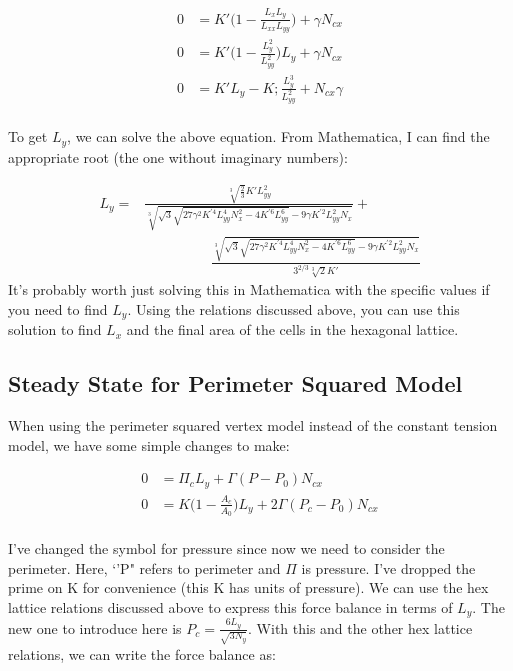 \documentclass[12pt]{article}
\begin{document}
\begin{center}
\begin{equation}
\begin{split}
0 &= K'\bigg( 1 - \frac{L_x L_y}{L_{xx} L_{yy}}\bigg) + \gamma N_{cx}\\
0 &= K'\bigg( 1 - \frac{L_y^2}{L_{yy}^2} \bigg)L_y + \gamma N_{cx}\\
0 &= K' L_y - K;\frac{L_y^3}{L_{yy}^2} + N_{cx} \gamma\\
\end{split}
\end{equation}
\end{center}
To get $L_y$, we can solve the above equation. From Mathematica, I can find the appropriate root (the one without imaginary numbers):

\begin{equation}
\begin{split}
L_y = &\frac{\sqrt[3]{\frac{2}{3}} K' L_{yy}^2}{\sqrt[3]{\sqrt{3} \sqrt{27 \gamma ^2 K^{'4} L_{yy}^4 N_x^2-4 K^{'6} L_{yy}^6}-9 \gamma  K^{'2} L_{yy}^2 N_x}} +\\  &\hspace{2cm} \frac{\sqrt[3]{\sqrt{3} \sqrt{27 \gamma ^2 K^{'4} L_{yy}^4 N_x^2-4 K^{'6} L_{yy}^6}-9 \gamma  K^{'2} L_{yy}^2 N_x}}{3^{2/3} \sqrt[3]{2}  K'}
\end{split}
\end{equation}
It's probably worth just solving this in Mathematica with the specific values if you need to find $L_y$. Using the relations discussed above, you can use this solution to find $L_x$ and the final area of the cells in the hexagonal lattice. 

\subsection{Steady State for Perimeter Squared Model}
When using the perimeter squared vertex model instead of the constant tension model, we have some simple changes to make:
\begin{center}
\begin{equation}
\begin{split}
0 &= \Pi_c L_y + \Gamma (P - P_0) N_{cx} \\
0 &= K \bigg(1 - \frac{A_c}{A_0}\bigg) L_y + 2 \Gamma (P_c - P_0) N_{cx}\\
\end{split}
\end{equation}
\end{center}
I've changed the symbol for pressure since now we need to consider the perimeter. Here, `'P" refers to perimeter and $\Pi$ is pressure.   I've dropped the prime on K for convenience (this K has units of pressure). We can use the hex lattice relations discussed above to express this force balance in terms of $L_y$. The new one to introduce here is $P_c = \frac{6 L_y}{\sqrt{3 N_y}}$. With this and the other hex lattice relations, we can write the force balance as:
\end{document}
